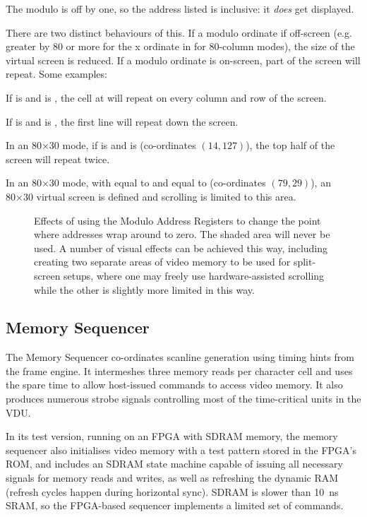 The modulo is off by one, so the address listed is inclusive: it {\em does\/}
get displayed.

There are two distinct behaviours of this. If a modulo ordinate if off-screen
(e.g. greater by 80 or more for the x ordinate in for 80-column modes), the
size of the virtual screen is reduced. If a modulo ordinate is on-screen, part
of the screen will repeat. Some examples:

If  is  and  is , the cell at
 will repeat on every column and row of the screen.

If  is  and  is , the first line will
repeat down the screen.

In an 80×30 mode, if  is  and  is 
(co-ordinates $(14,127)$), the top half of the screen will repeat twice.

In an 80×30 mode, with  equal to  and  equal to
 (co-ordinates $(79,29)$), an 80×30 virtual screen is defined and scrolling is limited to this
area.

\begin{figure}
 \centering
 \caption[Effects of the Modulo Address Register]{\label{fig:vdu-mar} Effects
   of using the Modulo Address Registers to change the point where addresses
   wrap around to zero. The shaded area will never be used. A number of visual
   effects can be achieved this way, including creating two separate areas of
   video memory to be used for split-screen setups, where one may freely use
   hardware-assisted scrolling while the other is slightly more limited in this
   way.}
\end{figure}


\subsection{Memory Sequencer}
\label{sec:vdu:memory-sequencer}

The Memory Sequencer co-ordinates scanline generation using timing hints from
the frame engine. It intermeshes three memory reads per character cell and uses
the spare time to allow host-issued commands to access video memory. It also
produces numerous strobe signals controlling most of the time-critical units in
the VDU.

In its test version, running on an FPGA with \gls{SDRAM} memory, the memory sequencer
also initialises video memory with a test pattern stored in the FPGA's ROM, and
includes an SDRAM state machine capable of issuing all necessary signals for
memory reads and writes, as well as refreshing the dynamic RAM (refresh cycles
happen during horizontal sync). SDRAM is slower than 10~ns SRAM, so the
FPGA-based sequencer implements a limited set of commands.

